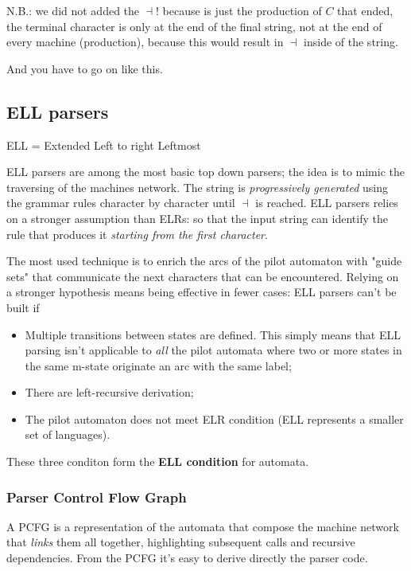 			N.B.: we did not added the $\dashv$! because 
			is just the production of $C$ that ended, the terminal character is only at the end of the final string, not at the end of every machine (production), because 
			this would result in $\dashv$ inside of the string.

			And you have to go on like this. %
		\subsection{ELL parsers}
			ELL = Extended Left to right Leftmost

			ELL parsers are among the most basic top down parsers; the idea is to mimic the traversing of the machines network. The string is 
			\emph{progressively generated} using the grammar rules character by character until $\dashv$ is reached. ELL parsers relies on a stronger assumption 
			than ELRs: so that the input string can identify the rule that produces it \emph{starting from the first character}.

			The most used technique is to enrich the arcs of the pilot automaton with "guide sets" that communicate the next characters that can be encountered. 
			Relying on a stronger hypothesis means being effective in fewer cases: ELL parsers can't be built if
			\begin{itemize}
				\item Multiple transitions between states are defined. This simply means that ELL parsing isn't applicable to \emph{all} the pilot automata where 
				two or more states in the same m-state originate an arc with the same label;
				\item There are left-recursive derivation;
				\item The pilot automaton does not meet ELR condition (ELL represents a smaller set of languages). 
			\end{itemize}
			These three conditon form the \textbf{ELL condition} for automata.
			
			\subsubsection{Parser Control Flow Graph}
				A PCFG is a representation of the automata that compose the machine network that \emph{links} them all together, highlighting subsequent calls 
				and recursive dependencies. From the PCFG it's easy to derive directly the parser code.

